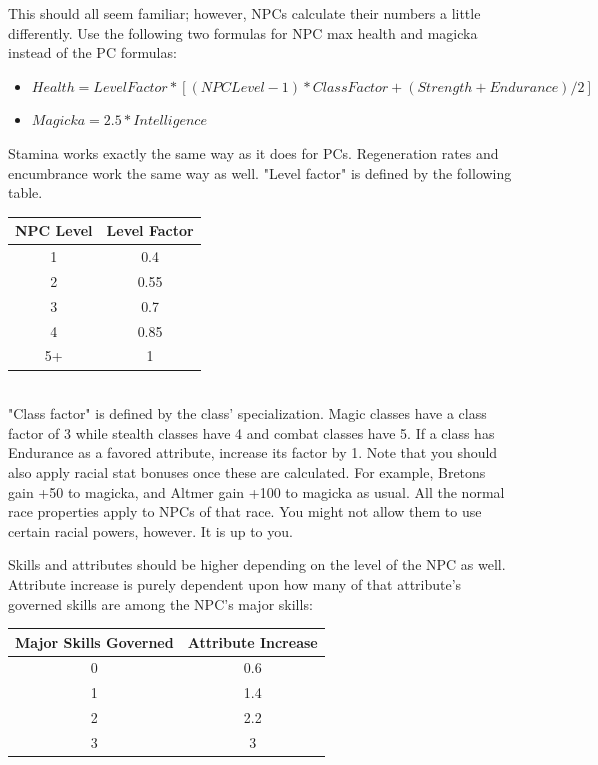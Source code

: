 \documentclass[12pt]{book}
\begin{document}
This should all seem familiar; however, NPCs calculate their numbers a little differently. Use the following two formulas for NPC max health and magicka instead of the PC formulas:

\begin{itemize}
	\item $Health=LevelFactor*[(NPCLevel-1)*ClassFactor+(Strength+Endurance)/2]$
	\item $Magicka=2.5*Intelligence$
\end{itemize}

Stamina works exactly the same way as it does for PCs. Regeneration rates and encumbrance work the same way as well. "Level factor" is defined by the following table.\\

\begin{tabular}{|c|c|}
\hline
NPC Level & Level Factor\\ \hline
1 & 0.4\\ \hline
2 & 0.55\\ \hline
3 & 0.7\\ \hline
4 & 0.85\\ \hline
5+ & 1\\ \hline
\end{tabular}\\

"Class factor" is defined by the class' specialization. Magic classes have a class factor of 3 while stealth classes have 4 and combat classes have 5. If a class has Endurance as a favored attribute, increase its factor by 1. Note that you should also apply racial stat bonuses once these are calculated. For example, Bretons gain +50 to magicka, and Altmer gain +100 to magicka as usual. All the normal race properties apply to NPCs of that race. You might not allow them to use certain racial powers, however. It is up to you.

Skills and attributes should be higher depending on the level of the NPC as well. Attribute increase is purely dependent upon how many of that attribute's governed skills are among the NPC's major skills:

\begin{tabular}{|c|c|}
\hline
Major Skills Governed & Attribute Increase\\ \hline
0 & 0.6\\ \hline
1 & 1.4\\ \hline
2 & 2.2\\ \hline
3 & 3\\ \hline
\end{tabular}
\end{document}
